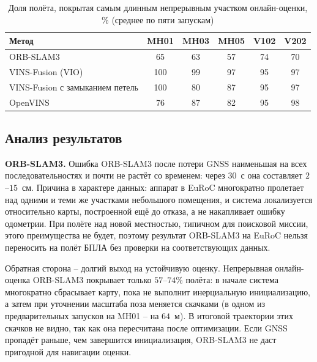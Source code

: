     \begin{table}[H]
        \caption{Доля полёта, покрытая самым длинным непрерывным участком онлайн-оценки, \% (среднее по пяти запускам)}
        \label{table:online_coverage}
        \small
        \centering
        \renewcommand{\arraystretch}{1.2}
        \begin{tabular}{|l|c|c|c|c|c|}
            \hline
            \textbf{Метод} & \textbf{MH01} & \textbf{MH03} & \textbf{MH05} & \textbf{V102} & \textbf{V202} \\
            \hline
            ORB-SLAM3 & 65 & 63 & 57 & 74 & 70 \\
            VINS-Fusion (VIO) & 100 & 99 & 97 & 95 & 97 \\
            VINS-Fusion с замыканием петель & 100 & 80 & 87 & 95 & 97 \\
            OpenVINS & 76 & 87 & 82 & 95 & 98 \\
            \hline
        \end{tabular}
    \end{table}

    \subsection{Анализ результатов}

    \textbf{ORB-SLAM3.}
    Ошибка ORB-SLAM3 после потери GNSS наименьшая на всех последовательностях и почти не растёт со временем: через $30$~с она составляет $2$--$15$~см.
    Причина в характере данных: аппарат в EuRoC многократно пролетает над одними и теми же участками небольшого помещения, и система локализуется относительно карты, построенной ещё до отказа, а не накапливает ошибку одометрии.
    При полёте над новой местностью, типичном для поисковой миссии, этого преимущества не будет, поэтому результат ORB-SLAM3 на EuRoC нельзя переносить на полёт БПЛА без проверки на соответствующих данных.

    Обратная сторона -- долгий выход на устойчивую оценку.
    Непрерывная онлайн-оценка ORB-SLAM3 покрывает только $57$--$74$\% полёта: в начале система многократно сбрасывает карту, пока не выполнит инерциальную инициализацию, а затем при уточнении масштаба поза меняется скачками (в одном из предварительных запусков на MH01 -- на $64$~м).
    В итоговой траектории этих скачков не видно, так как она пересчитана после оптимизации.
    Если GNSS пропадёт раньше, чем завершится инициализация, ORB-SLAM3 не даст пригодной для навигации оценки.


